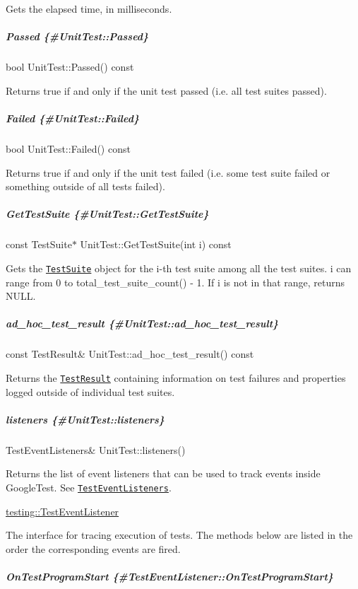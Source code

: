 Gets the elapsed time, in milliseconds.

\subparagraph*{Passed \{\#\+Unit\+Test\+::\+Passed\}}

{\ttfamily bool Unit\+Test\+::\+Passed() const}

Returns true if and only if the unit test passed (i.\+e. all test suites passed).

\subparagraph*{Failed \{\#\+Unit\+Test\+::\+Failed\}}

{\ttfamily bool Unit\+Test\+::\+Failed() const}

Returns true if and only if the unit test failed (i.\+e. some test suite failed or something outside of all tests failed).

\subparagraph*{Get\+Test\+Suite \{\#\+Unit\+Test\+::\+Get\+Test\+Suite\}}

{\ttfamily const Test\+Suite$\ast$ Unit\+Test\+::\+Get\+Test\+Suite(int i) const}

Gets the \href{#TestSuite}{\tt {\ttfamily Test\+Suite}} object for the {\ttfamily i}-\/th test suite among all the test suites. {\ttfamily i} can range from 0 to {\ttfamily total\+\_\+test\+\_\+suite\+\_\+count() -\/ 1}. If {\ttfamily i} is not in that range, returns {\ttfamily N\+U\+LL}.

\subparagraph*{ad\+\_\+hoc\+\_\+test\+\_\+result \{\#\+Unit\+Test\+::ad\+\_\+hoc\+\_\+test\+\_\+result\}}

{\ttfamily const Test\+Result\& Unit\+Test\+::ad\+\_\+hoc\+\_\+test\+\_\+result() const}

Returns the \href{#TestResult}{\tt {\ttfamily Test\+Result}} containing information on test failures and properties logged outside of individual test suites.

\subparagraph*{listeners \{\#\+Unit\+Test\+::listeners\}}

{\ttfamily Test\+Event\+Listeners\& Unit\+Test\+::listeners()}

Returns the list of event listeners that can be used to track events inside Google\+Test. See \href{#TestEventListeners}{\tt {\ttfamily Test\+Event\+Listeners}}.

{\ttfamily \mbox{\hyperlink{classtesting_1_1TestEventListener}{testing\+::\+Test\+Event\+Listener}}}

The interface for tracing execution of tests. The methods below are listed in the order the corresponding events are fired.

\subparagraph*{On\+Test\+Program\+Start \{\#\+Test\+Event\+Listener\+::\+On\+Test\+Program\+Start\}}

